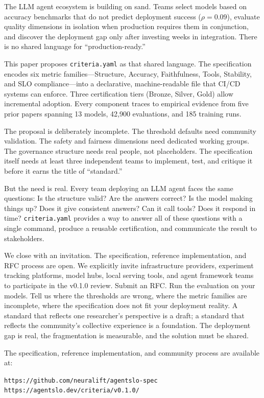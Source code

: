 \documentclass[11pt]{article}
\newcommand{\criteriayaml}{\texttt{criteria.yaml}}
\begin{document}
The LLM agent ecosystem is building on sand. Teams select models based on accuracy benchmarks that do not predict deployment success ($\rho = 0.09$), evaluate quality dimensions in isolation when production requires them in conjunction, and discover the deployment gap only after investing weeks in integration. There is no shared language for ``production-ready.''

This paper proposes \criteriayaml{} as that shared language. The specification encodes six metric families---Structure, Accuracy, Faithfulness, Tools, Stability, and SLO compliance---into a declarative, machine-readable file that CI/CD systems can enforce. Three certification tiers (Bronze, Silver, Gold) allow incremental adoption. Every component traces to empirical evidence from five prior papers spanning 13 models, 42{,}900 evaluations, and 185 training runs.

The proposal is deliberately incomplete. The threshold defaults need community validation. The safety and fairness dimensions need dedicated working groups. The governance structure needs real people, not placeholders. The specification itself needs at least three independent teams to implement, test, and critique it before it earns the title of ``standard.''

But the need is real. Every team deploying an LLM agent faces the same questions: Is the structure valid? Are the answers correct? Is the model making things up? Does it give consistent answers? Can it call tools? Does it respond in time? \criteriayaml{} provides a way to answer all of these questions with a single command, produce a reusable certification, and communicate the result to stakeholders.

We close with an invitation. The specification, reference implementation, and RFC process are open. We explicitly invite infrastructure providers, experiment tracking platforms, model hubs, local serving tools, and agent framework teams to participate in the v0.1.0 review. Submit an RFC. Run the evaluation on your models. Tell us where the thresholds are wrong, where the metric families are incomplete, where the specification does not fit your deployment reality. A standard that reflects one researcher's perspective is a draft; a standard that reflects the community's collective experience is a foundation. The deployment gap is real, the fragmentation is measurable, and the solution must be shared.

The specification, reference implementation, and community process are available at:
\begin{center}
\texttt{https://github.com/neuralift/agentslo-spec} \\
\texttt{https://agentslo.dev/criteria/v0.1.0/}
\end{center}
\end{document}
